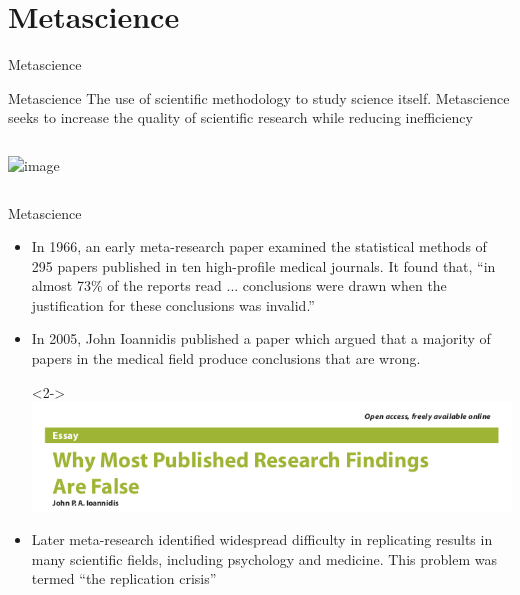 \documentclass{beamer}
\begin{document}
\section{Metascience}
\begin{frame}{Metascience}
	\begin{block}{Metascience}
		The use of scientific methodology to study science itself. Metascience seeks to increase the quality of scientific research while reducing inefficiency
	\end{block}

	\begin{columns}
		\begin{center}
		\includegraphics<2->[width=.7\textwidth]{../images/John_Ioannidis.jpg}
		\end{center}
	\end{columns}
\end{frame}

\begin{frame}{Metascience}
	\begin{itemize}
		\item<1-> In 1966, an early meta-research paper examined the statistical methods of 295 papers published in ten high-profile medical journals. It found that, ``in almost 73\% of the reports read ... conclusions were drawn when the justification for these conclusions was invalid.''
		\item<2-> In 2005, John Ioannidis published a paper which argued that a majority of papers in the medical field produce conclusions that are wrong.\\
		\item[]<2-> \includegraphics[width=.7\textwidth]{../images/moststudiesfalse.png}
		\item<3-> Later meta-research identified widespread difficulty in replicating results in many scientific fields, including psychology and medicine. This problem was termed ``the replication crisis''
	\end{itemize}
\end{frame}
\end{document}
